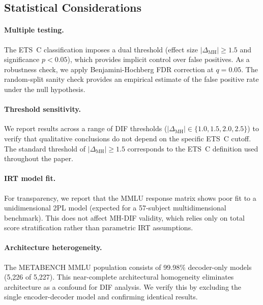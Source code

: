 \subsection{Statistical Considerations}
\label{app:statistical}

\paragraph{Multiple testing.} The ETS~C classification imposes a dual threshold (effect size $|\Delta_{\mathrm{MH}}| \geq 1.5$ and significance $p < 0.05$), which provides implicit control over false positives. As a robustness check, we apply Benjamini-Hochberg FDR correction at $q = 0.05$. The random-split sanity check provides an empirical estimate of the false positive rate under the null hypothesis.

\paragraph{Threshold sensitivity.} We report results across a range of DIF thresholds ($|\Delta_{\mathrm{MH}}| \in \{1.0, 1.5, 2.0, 2.5\}$) to verify that qualitative conclusions do not depend on the specific ETS~C cutoff. The standard threshold of $|\Delta_{\mathrm{MH}}| \geq 1.5$ corresponds to the ETS~C definition used throughout the paper.

\paragraph{IRT model fit.} For transparency, we report that the MMLU response matrix shows poor fit to a unidimensional 2PL model (expected for a 57-subject multidimensional benchmark). This does not affect MH-DIF validity, which relies only on total score stratification rather than parametric IRT assumptions.

\paragraph{Architecture heterogeneity.} The METABENCH MMLU population consists of 99.98\% decoder-only models (5,226 of 5,227). This near-complete architectural homogeneity eliminates architecture as a confound for DIF analysis. We verify this by excluding the single encoder-decoder model and confirming identical results.

